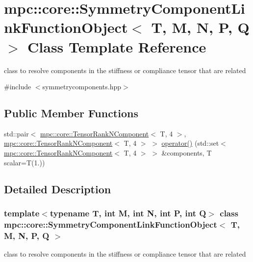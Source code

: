\hypertarget{structmpc_1_1core_1_1_symmetry_component_link_function_object}{}\section{mpc\+:\+:core\+:\+:Symmetry\+Component\+Link\+Function\+Object$<$ T, M, N, P, Q $>$ Class Template Reference}
\label{structmpc_1_1core_1_1_symmetry_component_link_function_object}


class to resolve components in the stiffness or compliance tensor that are related  




{\ttfamily \#include $<$symmetrycomponents.\+hpp$>$}

\subsection*{Public Member Functions}
\begin{DoxyCompactItemize}
\item 
std\+::pair$<$ \mbox{\hyperlink{classmpc_1_1core_1_1_tensor_rank_n_component}{mpc\+::core\+::\+Tensor\+Rank\+N\+Component}}$<$ T, 4 $>$, \mbox{\hyperlink{classmpc_1_1core_1_1_tensor_rank_n_component}{mpc\+::core\+::\+Tensor\+Rank\+N\+Component}}$<$ T, 4 $>$ $>$ \mbox{\hyperlink{structmpc_1_1core_1_1_symmetry_component_link_function_object_a835c4bb7146d3c316e218b2dca519261}{operator()}} (std\+::set$<$ \mbox{\hyperlink{classmpc_1_1core_1_1_tensor_rank_n_component}{mpc\+::core\+::\+Tensor\+Rank\+N\+Component}}$<$ T, 4 $>$ $>$ \&components, T scalar=T(1.))
\end{DoxyCompactItemize}


\subsection{Detailed Description}
\subsubsection*{template$<$typename T, int M, int N, int P, int Q$>$\newline
class mpc\+::core\+::\+Symmetry\+Component\+Link\+Function\+Object$<$ T, M, N, P, Q $>$}

class to resolve components in the stiffness or compliance tensor that are related 

